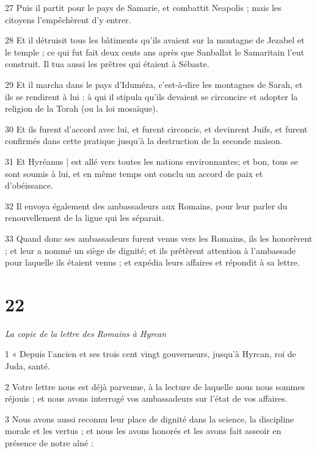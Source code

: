 \par 27 Puis il partit pour le pays de Samarie, et combattit Neapolis ; mais les citoyens l'empêchèrent d'y entrer.

\par 28 Et il détruisit tous les bâtiments qu'ils avaient sur la montagne de Jezabel et le temple ; ce qui fut fait deux cents ans après que Sanballat le Samaritain l'eut construit. Il tua aussi les prêtres qui étaient à Sébaste.

\par 29 Et il marcha dans le pays d'Iduméza, c'est-à-dire les montagnes de Sarah, et ils se rendirent à lui : à qui il stipula qu'ils devaient se circoncire et adopter la religion de la Torah (ou la loi mosaïque).

\par 30 Et ils furent d'accord avec lui, et furent circoncis, et devinrent Juifs, et furent confirmés dans cette pratique jusqu'à la destruction de la seconde maison.

\par 31 Et Hyréanus | est allé vers toutes les nations environnantes; et bon, tous se sont soumis à lui, et en même temps ont conclu un accord de paix et d'obéissance.

\par 32 Il envoya également des ambassadeurs aux Romains, pour leur parler du renouvellement de la ligue qui les séparait.

\par 33 Quand donc ses ambassadeurs furent venus vers les Romains, ils les honorèrent ; et leur a nommé un siège de dignité; et ils prêtèrent attention à l'ambassade pour laquelle ils étaient venus ; et expédia leurs affaires et répondit à sa lettre.

\chapter{22}

\textit{La copie de la lettre des Romains à Hyrcan}

\par 1 « Depuis l'ancien et ses trois cent vingt gouverneurs, jusqu'à Hyrcan, roi de Juda, santé.

\par 2 Votre lettre nous est déjà parvenue, à la lecture de laquelle nous nous sommes réjouis ; et nous avons interrogé vos ambassadeurs sur l'état de vos affaires.

\par 3 Nous avons aussi reconnu leur place de dignité dans la science, la discipline morale et les vertus ; et nous les avons honorés et les avons fait asseoir en présence de notre aîné :

